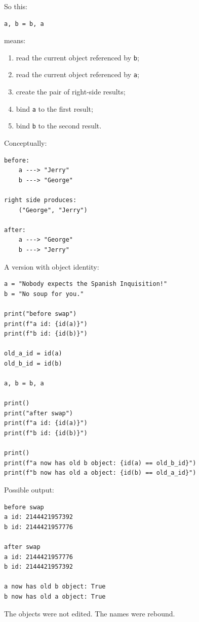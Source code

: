 So this:

\begin{verbatim}
a, b = b, a
\end{verbatim}

means:

\begin{enumerate}
    \item read the current object referenced by \texttt{b};
    \item read the current object referenced by \texttt{a};
    \item create the pair of right-side results;
    \item bind \texttt{a} to the first result;
    \item bind \texttt{b} to the second result.
\end{enumerate}

Conceptually:

\begin{verbatim}
before:
    a ---> "Jerry"
    b ---> "George"

right side produces:
    ("George", "Jerry")

after:
    a ---> "George"
    b ---> "Jerry"
\end{verbatim}

A version with object identity:

\begin{verbatim}
a = "Nobody expects the Spanish Inquisition!"
b = "No soup for you."

print("before swap")
print(f"a id: {id(a)}")
print(f"b id: {id(b)}")

old_a_id = id(a)
old_b_id = id(b)

a, b = b, a

print()
print("after swap")
print(f"a id: {id(a)}")
print(f"b id: {id(b)}")

print()
print(f"a now has old b object: {id(a) == old_b_id}")
print(f"b now has old a object: {id(b) == old_a_id}")
\end{verbatim}

Possible output:

\begin{verbatim}
before swap
a id: 2144421957392
b id: 2144421957776

after swap
a id: 2144421957776
b id: 2144421957392

a now has old b object: True
b now has old a object: True
\end{verbatim}

The objects were not edited. The names were rebound.

